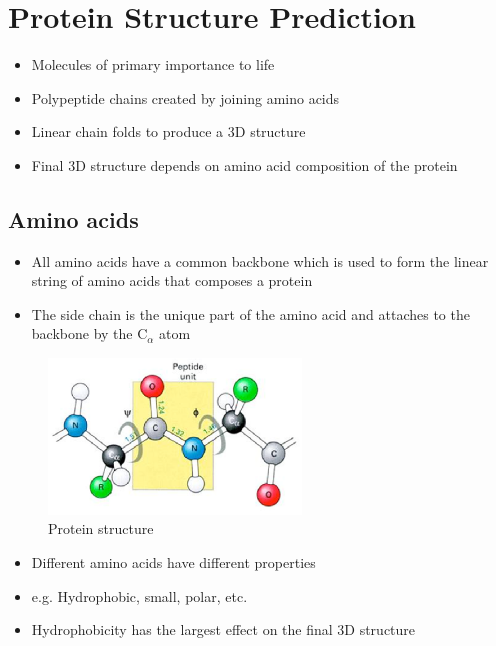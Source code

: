 \documentclass[a4paper]{article}
\begin{document}
\section{Protein Structure Prediction}

\begin{itemize}
  \item
    Molecules of primary importance to life

  \item
    Polypeptide chains created by joining amino acids

  \item
    Linear chain folds to produce a 3D structure

  \item
    Final 3D structure depends on amino acid composition of the protein
\end{itemize}

\subsection{Amino acids}

\begin{itemize}
  \item
    All amino acids have a common backbone which is used to form the linear
    string of amino acids that composes a protein

  \item
    The side chain is the unique part of the amino acid and attaches to the
    backbone by the $\mathrm{C}_{\alpha}$ atom
\end{itemize}

\begin{figure}[h!]
  \centering
  \includegraphics[width=0.6\textwidth]{graphics/protein_structure_chain.eps}
  \caption{Protein structure}
  \label{fig:protein_structure_chain}
\end{figure}
\FloatBarrier

\begin{itemize}
  \item
    Different amino acids have different properties

  \item
    e.g. Hydrophobic, small, polar, etc.

  \item
    Hydrophobicity has the largest effect on the final 3D structure
\end{itemize}
\end{document}
